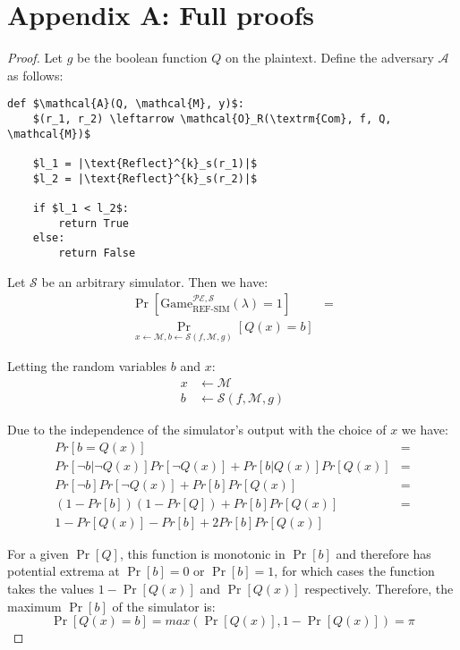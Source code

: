 \section*{Appendix A: Full proofs}

\begin{lemma}
\end{lemma}

\begin{proof}

Let $g$ be the boolean function $Q$ on the plaintext. Define the adversary
$\mathcal{A}$ as follows:

\begin{lstlisting}[texcl,mathescape,basicstyle=\small]
def $\mathcal{A}(Q, \mathcal{M}, y)$:
    $(r_1, r_2) \leftarrow \mathcal{O}_R(\textrm{Com}, f, Q, \mathcal{M})$

    $l_1 = |\text{Reflect}^{k}_s(r_1)|$
    $l_2 = |\text{Reflect}^{k}_s(r_2)|$

    if $l_1 < l_2$:
        return True
    else:
        return False
\end{lstlisting}

Let $\mathcal{S}$ be an arbitrary simulator. Then we have:
\begin{align*}
    \Pr[\text{Game}_{\text{REF-SIM}}^{\mathcal{PE},\mathcal{S}}
        (\lambda) = 1] &=\\
    \Pr_{x \leftarrow \mathcal{M}, b \leftarrow \mathcal{S}(f, \mathcal{M}, g)}
        [Q(x) = b]
\end{align*}

Letting the random variables $b$ and $x$:
\begin{align*}
    x &\leftarrow \mathcal{M}\\
    b &\leftarrow \mathcal{S}(f, \mathcal{M}, g)
\end{align*}

Due to the independence of the simulator's output with the choice of $x$ we have:
\begin{align*}
    Pr[b = Q(x)] &=\\
    Pr[\lnot b|\lnot Q(x)]Pr[\lnot Q(x)] + Pr[b|Q(x)]Pr[Q(x)] &=\\
    Pr[\lnot b]Pr[\lnot Q(x)] + Pr[b]Pr[Q(x)] &=\\
    (1 - Pr[b])(1 - Pr[Q]) + Pr[b]Pr[Q(x)] &=\\
    1 - Pr[Q(x)] - Pr[b] + 2Pr[b]Pr[Q(x)]
\end{align*}

For a given $\Pr[Q]$, this function is monotonic in $\Pr[b]$ and therefore has
potential extrema at $\Pr[b] = 0$ or $\Pr[b] = 1$, for which cases the function
takes the values $1 - \Pr[Q(x)]$ and $\Pr[Q(x)]$ respectively. Therefore, the
maximum $\Pr[b]$ of the simulator is:
\begin{equation*}
    \Pr[Q(x) = b] = max(\Pr[Q(x)], 1 - \Pr[Q(x)]) = \pi
\end{equation*}


\end{proof}
